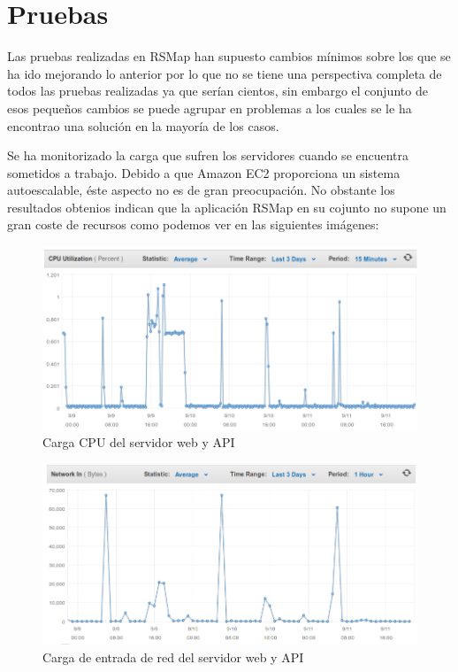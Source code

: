 \chapter{Pruebas}

Las pruebas realizadas en RSMap han supuesto cambios mínimos sobre los que se ha ido mejorando lo anterior por lo que no se tiene una perspectiva completa de todos las pruebas realizadas ya que serían cientos, sin embargo el conjunto de esos pequeños cambios se puede agrupar en problemas a los cuales se le ha encontrao una solución en la mayoría de los casos.
\bigskip

Se ha monitorizado la carga que sufren los servidores cuando se encuentra sometidos a trabajo. Debido a que Amazon EC2 proporciona un sistema autoescalable, éste aspecto no es de gran preocupación. No obstante los resultados obtenios indican que la aplicación RSMap en su cojunto no supone un gran coste de recursos como podemos ver en las siguientes imágenes:

\begin{figure}[ht]
  \begin{center}
    \includegraphics[scale=0.40]{../images/amazon/cpuweb.png}
    \caption{Carga CPU del servidor web y API}
    \label{fig:paquetes}
  \end{center}
\end{figure}

\newpage

\begin{figure}[ht]
  \begin{center}
    \includegraphics[scale=0.40]{../images/amazon/netweb.png}
    \caption{Carga de entrada de red del servidor web y API}
    \label{fig:paquetes}
  \end{center}
\end{figure}

